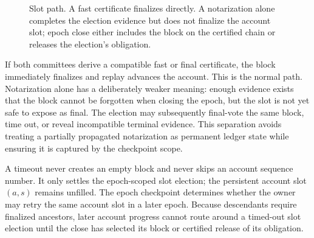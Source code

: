 \documentclass[sigplan,review,anonymous]{acmart}
\begin{document}
\begin{figure}[t]
\centering
{}
\caption{Slot path.  A fast certificate finalizes directly.  A notarization alone completes the election evidence but does not finalize the account slot; epoch close either includes the block on the certified chain or releases the election's obligation.}
\label{fig:slotpath}
\end{figure}

If both committees derive a compatible fast or final certificate, the block immediately finalizes and replay advances the account.  This is the normal path.  Notarization alone has a deliberately weaker meaning: enough evidence exists that the block cannot be forgotten when closing the epoch, but the slot is not yet safe to expose as final.  The election may subsequently final-vote the same block, time out, or reveal incompatible terminal evidence.  This separation avoids treating a partially propagated notarization as permanent ledger state while ensuring it is captured by the checkpoint scope.

A timeout never creates an empty block and never skips an account sequence number.  It only settles the epoch-scoped slot election; the persistent account slot $(a,s)$ remains unfilled.  The epoch checkpoint determines whether the owner may retry the same account slot in a later epoch.  Because descendants require finalized ancestors, later account progress cannot route around a timed-out slot election until the close has selected its block or certified release of its obligation.
\end{document}
